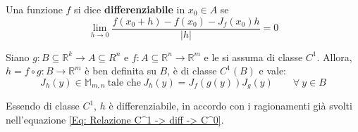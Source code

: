 \begin{definition} \label{Def: Differenziabilità di f. vettoriali}
    Una funzione $f$ si dice \textbf{differenziabile} in $x_0 \in A$ se
    \begin{equation}
        \lim_{h \to 0}{\frac{f(x_0+h)-f(x_0)-J_f(x_0)h}{|h|}}=0
    \end{equation}
\end{definition}

\begin{theorem} \label{Teo: Derivata composta di f. vettoriali}
Siano $g: B \subseteq \mathbb{R}^k \to A \subseteq R^n$ e $f: A \subseteq \mathbb{R}^n \to \mathbb{R}^m$ e le si assuma di classe $C^1$. Allora, $h=f \circ g: B \to \mathbb{R}^m$ è ben definita su $B$, è di classe $C^1(B)$ e vale:
\begin{equation}
    J_h(y) \in \mathbb{M}_{m,n}\ \text{tale che}\ J_h(y)=J_f(g(y)) J_g(y) \qquad \forall\ y \in B
\end{equation}
\end{theorem}
\begin{oss}
    Essendo di classe $C^1$, $h$ è differenziabile, in accordo con i ragionamenti già svolti nell'equazione \eqref{Eq: Relazione C^1 -> diff -> C^0}.
\end{oss}